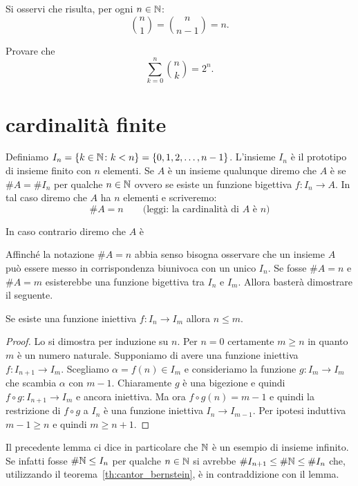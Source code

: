 Si osservi che risulta, per ogni $n\in {\mathbb N}$:
\[
  {n \choose 1} = {n \choose n-1} = n.
\]
  
\begin{exercise}
  Provare che
  \[
   \sum_{k=0}^n {n \choose k} = 2^n.
  \]
\end{exercise}

\section{cardinalità finite}
  
\begin{definition}
  Definiamo $I_n = {\left\{ k\in {\mathbb N} \colon k<n \right\}} = \{ 0,1, 2, \dots, n-1\}$.
  L'insieme $I_n$ è il prototipo di insieme finito con $n$ elementi.
  Se $A$ è un insieme qualunque diremo che $A$ è  
  se $\#A = \#I_n$ per qualche $n\in {\mathbb N}$ ovvero se esiste 
  un funzione bigettiva $f\colon I_n \to A$.
  In tal caso diremo che $A$ ha $n$ elementi e scriveremo:
  \[
    \# A = n\qquad\text{(leggi: la cardinalità di $A$ è $n$)}
  \]

  In caso contrario diremo che $A$ è 
\end{definition}

Affinché la notazione $\# A = n$ abbia senso bisogna osservare che un insieme 
$A$ può essere messo in corrispondenza biunivoca con un unico $I_n$. 
Se fosse $\# A = n$ e $\# A = m$ esisterebbe una funzione bigettiva 
tra $I_n$ e $I_m$. Allora basterà dimostrare il seguente.

\begin{lemma}
Se esiste una funzione iniettiva $f\colon I_n \to I_m$ 
allora $n\le m$. 
\end{lemma}
\begin{proof}
  Lo si dimostra per induzione su $n$. 
  Per $n=0$ certamente $m\ge n$ in quanto $m$ è un numero naturale.
  Supponiamo di avere una funzione iniettiva $f\colon I_{n+1}\to I_m$.
  Scegliamo $\alpha = f(n) \in I_m$ e consideriamo la funzione 
  $g\colon I_m\to I_m$ che scambia $\alpha$ con $m-1$.
  Chiaramente $g$ è una bigezione e quindi $f\circ g\colon I_{n+1}\to I_m$ 
  e ancora iniettiva. 
  Ma ora $f\circ g(n)=m-1$ e quindi la restrizione di $f\circ g$ a $I_n$ è una funzione 
  iniettiva $I_n \to I_{m-1}$. Per ipotesi induttiva $m-1\ge n$ e quindi $m\ge n+1$.
\end{proof}

Il precedente lemma ci dice in particolare che ${\mathbb N}$ è un esempio di insieme infinito.
Se infatti fosse $\#{\mathbb N} \le I_n$ per qualche $n\in {\mathbb N}$ si avrebbe
$\# I_{n+1}\le \#{\mathbb N} \le \#I_n$ che, utilizzando il teorema~\ref{th:cantor_bernstein},
è in contraddizione con il lemma.

